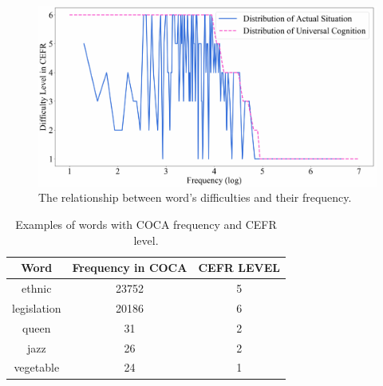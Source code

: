 \begin{figure}[th]
	\centering
	\includegraphics[width=\linewidth]{pic/example.pdf}  
	\vspace{-0.25cm}
	\caption{\label{tab:freqeg} The relationship between word's difficulties and their frequency.}
	\label{fig:freqeg}
\end{figure}
\vspace{-0.5cm}
\begin{table}[th]
	\scriptsize
\begin{center}
		\begin{tabular}{ccc}
		\hline
		\textbf{Word} & \textbf{Frequency in COCA} & \textbf{CEFR LEVEL} \\ \hline
		ethnic & 23752 & 5 \\ 
		legislation & 20186 & 6 \\ 
		queen & 31 & 2 \\ 
		jazz & 26 & 2 \\ 
		vegetable & 24& 1 \\ \hline
	\end{tabular}
\end{center}
\vspace{-0.25cm}
\caption{\label{tab:words} Examples of words with COCA frequency and CEFR level.}
\end{table}

